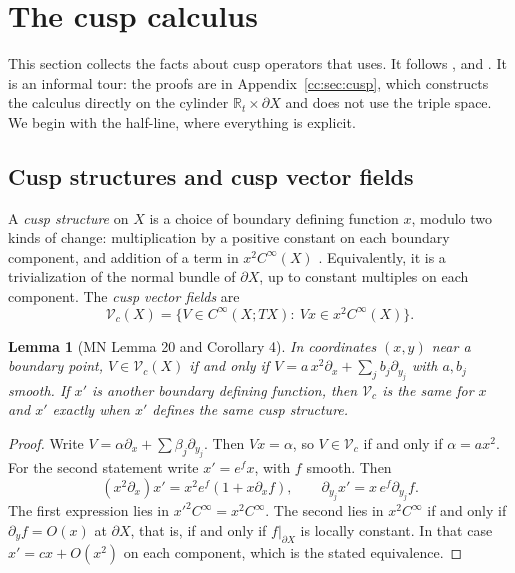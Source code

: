 \documentclass[11pt,oneside,reqno]{article}
\newcommand{\R}{\mathbb R}
\newcommand{\CI}{C^\infty}
\theoremstyle{plain}
\newtheorem{lemma}[theorem]{Lemma}
\theoremstyle{definition}
\theoremstyle{remark}
\begin{document}
\section{The cusp calculus}\label{sec:cusp}

This section collects the facts about cusp operators that \cite{MN} uses.
It follows \cite[App.~A--C]{MN}, \cite{MazzeoMelrose} and
\cite{MelroseFibrations}. It is an informal tour: the proofs are in
Appendix~\ref{cc:sec:cusp}, which constructs the calculus directly on the
cylinder \(\R_t\times\partial X\) and does not use the triple space. We
begin with the half-line, where everything is explicit.

\subsection{Cusp structures and cusp vector fields}\label{subsec:cuspstructure}
A \emph{cusp structure} on \(X\) is a choice of boundary defining
function \(x\), modulo two kinds of change: multiplication by a positive
constant on each boundary component, and addition of a term in
\(x^2\CI(X)\) \cite[App.~A]{MN}. Equivalently, it is a trivialization of
the normal bundle of \(\partial X\), up to constant multiples on each
component. The \emph{cusp vector fields} are \cite[(6), (114)]{MN}
\[
 \mathcal V_c(X)=\{V\in\CI(X;TX):\ Vx\in x^2\CI(X)\}.
\]

\begin{lemma}[MN Lemma 20 and Corollary 4]\label{lem:cuspvf}
In coordinates \((x,y)\) near a boundary point, \(V\in\mathcal V_c(X)\)
if and only if \(V=a\,x^2\partial_x+\sum_jb_j\partial_{y_j}\) with
\(a,b_j\) smooth. If \(x'\) is another boundary defining function, then
\(\mathcal V_c\) is the same for \(x\) and \(x'\) exactly when \(x'\)
defines the same cusp structure.
\end{lemma}

\begin{proof}
Write \(V=\alpha\partial_x+\sum\beta_j\partial_{y_j}\). Then \(Vx=\alpha\),
so \(V\in\mathcal V_c\) if and only if \(\alpha=ax^2\). For the second
statement write \(x'=e^{f}x\), with \(f\) smooth. Then
\[
 (x^2\partial_x)x'=x^2e^f(1+x\partial_xf),\qquad
 \partial_{y_j}x'=x\,e^f\partial_{y_j}f .
\]
The first expression lies in \(x'^2\CI=x^2\CI\). The second lies in
\(x^2\CI\) if and only if \(\partial_yf=O(x)\) at \(\partial X\), that is,
if and only if \(f|_{\partial X}\) is locally constant. In that case
\(x'=cx+O(x^2)\) on each component, which is the stated equivalence.
\end{proof}
\end{document}
